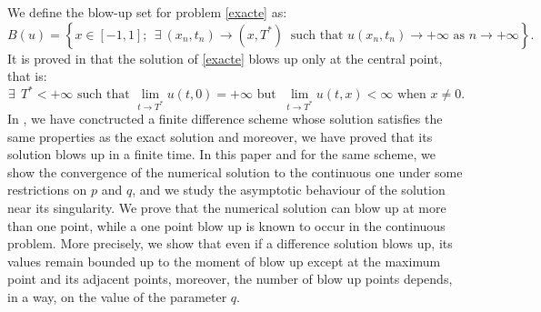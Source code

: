 \documentclass[a4paper,12pt,english,reqno]{smfart}
\begin{document}
	\noindent We define the blow-up set for problem \eqref{exacte} as:
	\begin{equation*}
	B(u)=\left\{ x\in [-1,1];\ \ \exists \  (x_{n},t_{n})\rightarrow (x,T^{*})\ \text{ such that } u(x_{n},t_{n})\rightarrow +\infty  \text{ as } n\rightarrow +\infty \right\}.
	\end{equation*}
	It is proved in \cite{chiblikfila} that the solution of \eqref{exacte} blows up only at the central point, that is:
	\begin{equation*}
	\exists \ \ T^{*}<+\infty  \text{ such that }  \lim_{t\rightarrow T^{*}}u(t,0)=+\infty \text{ but }\ \lim_{t\rightarrow T^{*}}u(t,x)<\infty \text{   when  }  x\neq 0.
	\end{equation*}
	In \cite{hani}, we have conctructed a finite difference scheme whose solution satisfies the same properties as the exact solution and moreover, we have proved that its solution blows up in a finite time. In this paper and for the same scheme, we show the convergence of the numerical solution to the continuous one under some restrictions on $p$ and $q$, and we study the asymptotic behaviour of the solution near its singularity. We prove that the numerical solution can blow up at more than one point, while a one point blow up is known to occur in the continuous problem. More precisely, we show that even if a difference solution blows up, its values remain bounded up to the moment of blow up except at the maximum point and its adjacent points, moreover, the number of blow up points depends, in a way, on the value of the parameter $q$.\\
	
\end{document}
